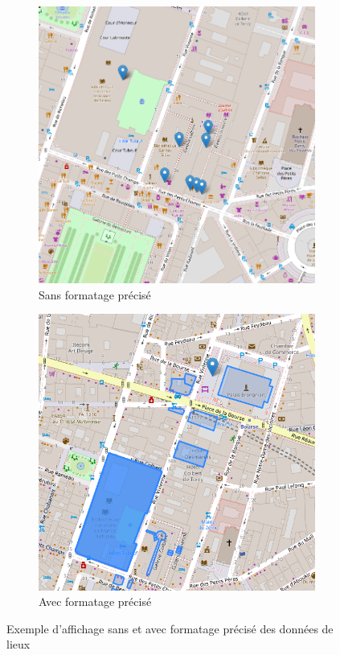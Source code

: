 \begin{figure}[h!]
    \begin{subfigure}{.5\textwidth}
      \centering
    \includegraphics[width=.7\linewidth]{images/1er-affichage.png}
    \caption{Sans formatage précisé}
    \label{fig:2eme-affichage}
    \end{subfigure}
    \begin{subfigure}{.5\textwidth}
      \centering
      \includegraphics[width=0.7\linewidth]{images/2eme-affichage.png}
    \caption{Avec formatage précisé}
    \label{fig:1er-affichage}
    \end{subfigure}
    \caption{Exemple d'affichage sans et avec formatage précisé des données de lieux}
\label{fig:affichage-defauts}
\end{figure}

